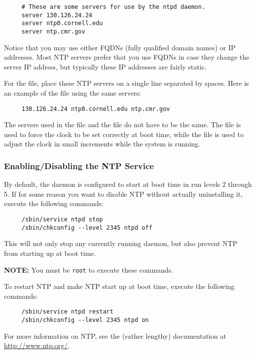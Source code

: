 \begin{verbatim}
     # These are some servers for use by the ntpd daemon.
     server 130.126.24.24
     server ntp0.cornell.edu
     server ntp.cmr.gov
\end{verbatim}

Notice that you may use either FQDNs (fully qualified domain names) or IP
addresses.  Most NTP servers prefer that you use FQDNs in case they change
the server IP address, but typically these IP addresses are fairly static.

For the  file, place these NTP servers on a
single line separated by spaces.  Here is an example of the
 file using the same servers:

\begin{verbatim}
     130.126.24.24 ntp0.cornell.edu ntp.cmr.gov
\end{verbatim}

The servers used in the  file and the
 file do not have to be the same.  The
 file is used to force the clock to be set
correctly at boot time, while the  file is used to
adjust the clock in small increments while the system is running.

\subsubsection{Enabling/Disabling the NTP Service}

By default, the  daemon is configured to start at boot time in
run levels 2 through 5.  If for some reason you want to disable NTP without
actually uninstalling it, execute the following commands:

\begin{verbatim}
     /sbin/service ntpd stop
     /sbin/chkconfig --level 2345 ntpd off
\end{verbatim}

This will not only stop any currently running  daemon, but also
prevent NTP from starting up at boot time.

\bigskip 

{\bf NOTE:} You must be {\tt root} to execute these commands.

\bigskip 

To restart NTP and make NTP start up at boot time, execute the following
commands:

\begin{verbatim}
     /sbin/service ntpd restart
     /sbin/chkconfig --level 2345 ntpd on
\end{verbatim}

For more information on NTP, see the (rather lengthy) documentation at 
\url{http://www.ntp.org/}.



